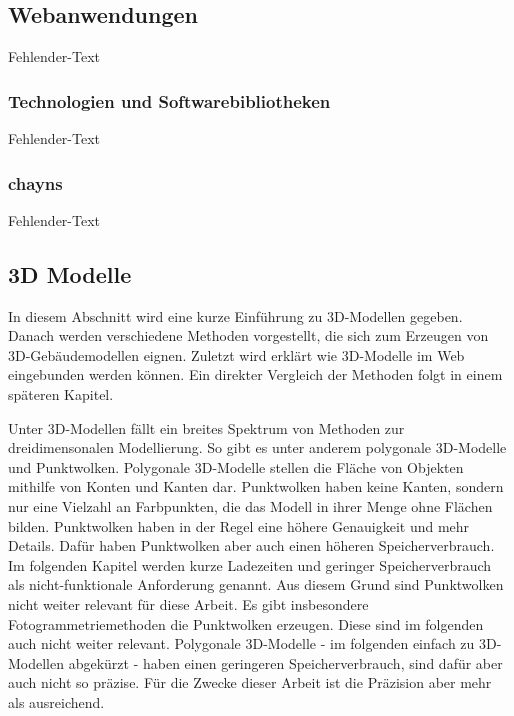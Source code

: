 \subsection{Webanwendungen}
Fehlender-Text

\subsubsection{Technologien und Softwarebibliotheken}\label{sec:WebTechnologies}
Fehlender-Text

\subsubsection{chayns}\label{sec:Chayns}
Fehlender-Text

\subsection{3D Modelle}
In diesem Abschnitt wird eine kurze Einführung zu 3D-Modellen gegeben. Danach werden verschiedene Methoden vorgestellt, die sich zum Erzeugen von 3D-Gebäudemodellen eignen. Zuletzt wird erklärt wie 3D-Modelle im Web eingebunden werden können. Ein direkter Vergleich der Methoden folgt in einem späteren Kapitel.

Unter 3D-Modellen fällt ein breites Spektrum von Methoden zur dreidimensonalen Modellierung. So gibt es unter anderem polygonale 3D-Modelle und Punktwolken. Polygonale 3D-Modelle stellen die Fläche von Objekten mithilfe von Konten und Kanten dar. Punktwolken haben keine Kanten, sondern nur eine Vielzahl an Farbpunkten, die das Modell in ihrer Menge ohne Flächen bilden. Punktwolken haben in der Regel eine höhere Genauigkeit und mehr Details. Dafür haben Punktwolken aber auch einen höheren Speicherverbrauch. Im folgenden Kapitel werden kurze Ladezeiten und geringer Speicherverbrauch als nicht-funktionale Anforderung genannt. Aus diesem Grund sind Punktwolken nicht weiter relevant für diese Arbeit. Es gibt insbesondere Fotogrammetriemethoden die Punktwolken erzeugen. Diese sind im folgenden auch nicht weiter relevant. Polygonale 3D-Modelle - im folgenden einfach zu 3D-Modellen abgekürzt - haben einen geringeren Speicherverbrauch, sind dafür aber auch nicht so präzise. Für die Zwecke dieser Arbeit ist die Präzision aber mehr als ausreichend.

